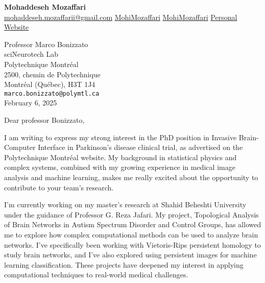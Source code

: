 \documentclass[letterpaper,11pt]{letter}
\begin{document}
\begin{center}
    \textbf{\Huge Mohaddeseh Mozaffari} \\

	\href{mailto:mohaddeseh.mozaffarii@gmail.com}{ mohaddeseh.mozaffarii@gmail.com}
	\hspace{5pt} 
	\href{https://www.linkedin.com/in/MohiMozaffari/}{ MohiMozaffari}
	\hspace{5pt} 
	\href{https://github.com/MohiMozaffari}{ MohiMozaffari}
	\hspace{5pt} 
	\href{https://mohimozaffari.github.io/}{ Personal Website} 
\end{center}

\vspace{1em}

\begin{flushleft}
    Professor Marco Bonizzato\\
    sciNeurotech Lab\\
    Polytechnique Montréal\\
    2500, chemin de Polytechnique\\
    Montréal (Québec), H3T 1J4\\
    \texttt{marco.bonizzato@polymtl.ca} \\
    February 6, 2025
\end{flushleft}


\begin{flushleft}
    Dear professor Bonizzato,
\end{flushleft}

\vspace{1em}

I am writing to express my strong interest in the PhD position in Invasive Brain-Computer Interface in Parkinson's disease clinical trial, as advertised on the Polytechnique Montréal website.
My background in statistical physics and complex systems, combined with my growing experience in medical image analysis and machine learning, makes me really excited about the opportunity to contribute to your team’s research.

I’m currently working on my master’s research at Shahid Beheshti University under the guidance of Professor G. Reza Jafari. My project, Topological Analysis of Brain Networks in Autism Spectrum Disorder and Control Groups, has allowed me to explore how complex computational methods can be used to analyze brain networks.  I’ve specifically been working with Vietoris-Rips persistent homology to study brain networks, and I’ve also explored using persistent images for machine learning classification. These projects have deepened my interest in applying computational techniques to real-world medical challenges.
\end{document}
